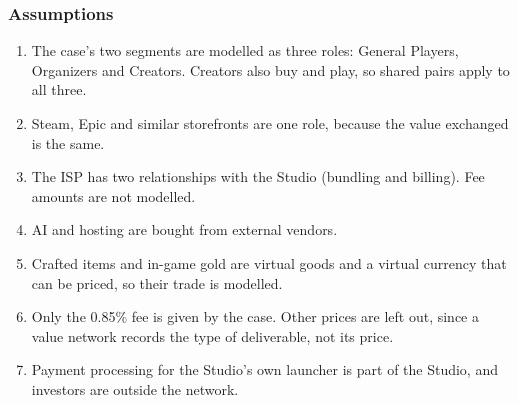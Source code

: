 \subsubsection{Assumptions}

\begin{enumerate}
    \item The case's two segments are modelled as three roles: General Players, Organizers and Creators. Creators also buy and
    play, so shared pairs apply to all three.
    \item Steam, Epic and similar storefronts are one role, because the value exchanged is the same.
    \item The ISP has two relationships with the Studio (bundling and billing). Fee amounts are not modelled.
    \item AI and hosting are bought from external vendors.
    \item Crafted items and in-game gold are virtual goods and a virtual currency that can be priced, so their trade is modelled.
    \item Only the 0.85\% fee is given by the case. Other prices are left out, since a value network records the type of
    deliverable, not its price.
    \item Payment processing for the Studio's own launcher is part of the Studio, and investors are outside the network.
\end{enumerate}

